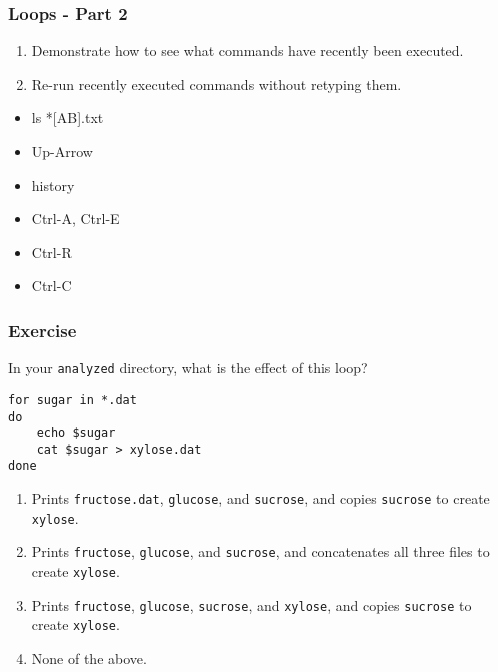 \documentclass[xcolor=dvipsnames]{beamer}
\begin{document}
\begin{frame}
\frametitle{Loops - Part 2}
\begin{enumerate}
  \item Demonstrate how to see what commands have recently been executed.
  \item Re-run recently executed commands without retyping them.
\end{enumerate}
\begin{multicols}{2}
\begin{itemize}
  \item ls *[AB].txt
  \item Up-Arrow
  \item history
  \item Ctrl-A, Ctrl-E
  \item Ctrl-R
  \item Ctrl-C
\end{itemize}
\end{multicols}
\end{frame}


\begin{frame}[fragile]
\frametitle{Exercise}
In your {\tt analyzed} directory, what is the effect of this loop?

\begin{verbatim}
for sugar in *.dat
do
    echo $sugar
    cat $sugar > xylose.dat
done
\end{verbatim}
\begin{enumerate}
  \item Prints {\tt fructose.dat}, {\tt glucose}, and {\tt sucrose}, and copies {\tt sucrose} to create {\tt xylose}.
  \item Prints {\tt fructose}, {\tt glucose}, and {\tt sucrose}, and concatenates all three files to create {\tt xylose}.
  \item Prints {\tt fructose}, {\tt glucose}, {\tt sucrose}, and {\tt xylose}, and copies {\tt sucrose} to create {\tt xylose}.
  \item None of the above.
\end{enumerate}
\end{frame}
\end{document}
